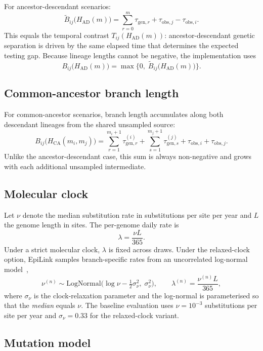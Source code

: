 \documentclass[11pt,a4paper]{article}
\begin{document}
For ancestor-descendant scenarios:
\[
	\widetilde{B}_{ij}\!\bigl(H_{\mathrm{AD}}(m)\bigr)
	= \sum_{r=0}^{m} \tau_{\mathrm{gen},r}
	+ \tau_{\mathrm{obs},j}
	- \tau_{\mathrm{obs},i}.
\]
This equals the temporal contrast $T_{ij}(H_{\mathrm{AD}}(m))$: ancestor-descendant genetic separation is driven by the same elapsed time that determines the expected testing gap. Because lineage lengths cannot be negative, the implementation uses
\[
	B_{ij}\!\bigl(H_{\mathrm{AD}}(m)\bigr)
	= \max\!\bigl\{0,\;\widetilde{B}_{ij}\!\bigl(H_{\mathrm{AD}}(m)\bigr)\bigr\}.
\]

\subsection{Common-ancestor branch length}\label{sec:S1_ca_branch}

For common-ancestor scenarios, branch length accumulates along both descendant lineages from the shared unsampled source:
\[
	B_{ij}\!\bigl(H_{\mathrm{CA}}(m_i,m_j)\bigr)
	= \sum_{r=1}^{m_i+1} \tau_{\mathrm{gen},r}^{(i)}
	+ \sum_{s=1}^{m_j+1} \tau_{\mathrm{gen},s}^{(j)}
	+ \tau_{\mathrm{obs},i}
	+ \tau_{\mathrm{obs},j}.
\]
Unlike the ancestor-descendant case, this sum is always non-negative and grows with each additional unsampled intermediate.

\subsection{Molecular clock}\label{sec:S1_clock}

Let $\nu$ denote the median substitution rate in substitutions per site per year and $L$ the genome length in sites. The per-genome daily rate is
\[
	\lambda = \frac{\nu L}{365}.
\]
Under a strict molecular clock, $\lambda$ is fixed across draws. Under the relaxed-clock option, EpiLink samples branch-specific rates from an uncorrelated log-normal model~\cite{Drummond2006},
\[
	\nu^{(n)} \sim \mathrm{LogNormal}\!\bigl(\log \nu - \tfrac{1}{2}\sigma_\nu^2,\; \sigma_\nu^2\bigr),
	\qquad
	\lambda^{(n)} = \frac{\nu^{(n)} L}{365},
\]
where $\sigma_\nu$ is the clock-relaxation parameter and the log-normal is parameterised so that the \emph{median} equals $\nu$. The baseline evaluation uses $\nu = 10^{-3}$ substitutions per site per year and $\sigma_\nu = 0.33$ for the relaxed-clock variant.

\subsection{Mutation model}\label{sec:S1_mutation}
\end{document}
